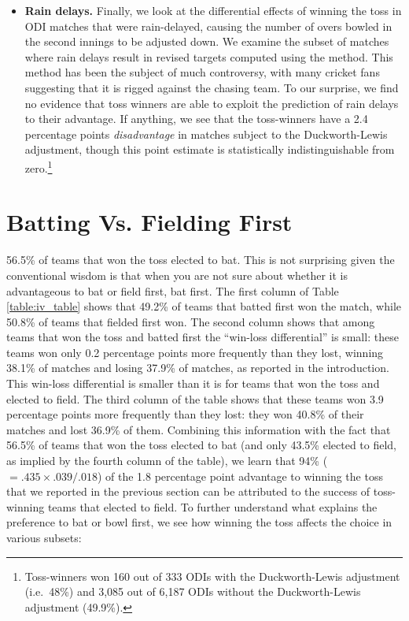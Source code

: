 \documentclass[12pt, letterpaper]{article}
\begin{document}
\begin{itemize}
\item \textbf{Rain delays.} Finally, we look at the differential effects of winning the toss in ODI matches that were rain-delayed, causing the number of overs bowled in the second innings to be adjusted down. We examine the subset of matches where rain delays result in revised targets computed using the \citet{duckworth1998} method. This method has been the subject of much controversy, with many cricket fans suggesting that it is rigged against the chasing team. To our surprise, we find no evidence that toss winners are able to exploit the prediction of rain delays to their advantage. If anything, we see that the toss-winners have a 2.4 percentage points \emph{disadvantage} in matches subject to the Duckworth-Lewis adjustment, though this point estimate is statistically indistinguishable from zero.\footnote{Toss-winners won 160 out of 333 ODIs with the Duckworth-Lewis adjustment (i.e.~48\%) and 3,085 out of 6,187 ODIs without the Duckworth-Lewis adjustment (49.9\%).} 

\end{itemize}

\section{Batting Vs. Fielding First}

56.5\% of teams that won the toss elected to bat. This is not surprising given the conventional wisdom is that when you are not sure about whether it is advantageous to bat or field first, bat first. The first column of Table \ref{table:iv_table} shows that 49.2\% of teams that batted first won the match, while 50.8\% of teams that fielded first won. The second column shows that among teams that won the toss and batted first the ``win-loss differential'' is small: these teams won only 0.2 percentage points more frequently than they lost, winning 38.1\% of matches and losing 37.9\% of matches, as reported in the introduction. This win-loss differential is smaller than it is for teams that won the toss and elected to field. The third column of the table shows that these teams won 3.9 percentage points more frequently than they lost: they won 40.8\% of their matches and lost 36.9\% of them. Combining this information with the fact that 56.5\% of teams that won the toss elected to bat (and only 43.5\% elected to field, as implied by the fourth column of the table), we learn that 94\% ($= .435 \times .039/.018$) of the 1.8 percentage point advantage to winning the toss that we reported in the previous section can be attributed to the success of toss-winning teams that elected to field. To further understand what explains the preference to bat or bowl first, we see how winning the toss affects the choice in various subsets:
\end{document}
